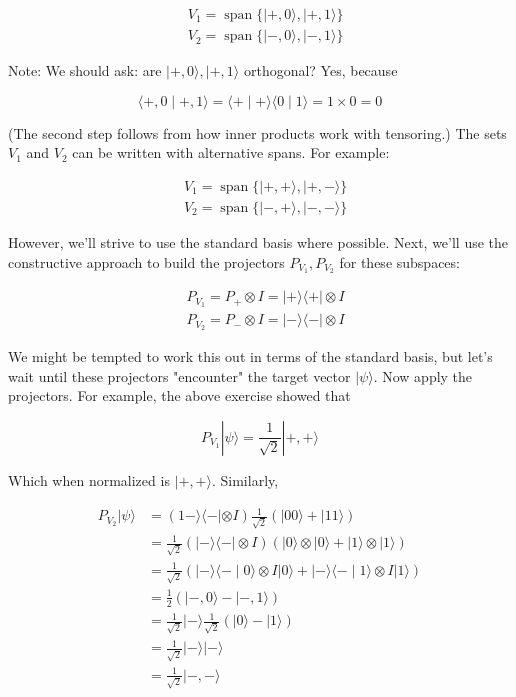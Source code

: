 \documentclass[main.tex]{subfiles}
\begin{document}
    $$
    \begin{aligned}
    &V_{1}=\operatorname{span}\{|+, 0\rangle,|+, 1\rangle\} \\
    &V_{2}=\operatorname{span}\{|-, 0\rangle,|-, 1\rangle\}
    \end{aligned}
    $$
    
    Note: We should ask: are $|+, 0\rangle,|+, 1\rangle$ orthogonal? Yes, because
    
    $$
    \langle+, 0 \mid+, 1\rangle=\langle+\mid+\rangle\langle 0 \mid 1\rangle=1 \times 0=0
    $$
    
    (The second step follows from how inner products work with tensoring.) The sets $V_{1}$ and $V_{2}$ can be written with alternative spans. For example:
    
    $$
    \begin{aligned}
    &V_{1}=\operatorname{span}\{|+,+\rangle,|+,-\rangle\} \\
    &V_{2}=\operatorname{span}\{|-,+\rangle,|-,-\rangle\}
    \end{aligned}
    $$
    
    However, we'll strive to use the standard basis where possible. Next, we'll use the constructive approach to build the projectors $P_{V_{1}}, P_{V_{2}}$ for these subspaces:
    
    $$
    \begin{aligned}
    &P_{V_{1}}=P_{+} \otimes I=|+\rangle\langle+| \otimes I \\
    &P_{V_{2}}=P_{-} \otimes I=|-\rangle\langle-| \otimes I
    \end{aligned}
    $$
    
    We might be tempted to work this out in terms of the standard basis, but let's wait until these projectors "encounter" the target vector $|\psi\rangle$. Now apply the projectors. For example, the above exercise showed that
    
    $$
    P_{V_{1}}|\psi\rangle=\frac{1}{\sqrt{2}}|+,+\rangle
    $$
    
    Which when normalized is $|+,+\rangle$. Similarly,
    
    $$
    \begin{aligned}
    P_{V_{2}}|\psi\rangle &=(1-\rangle\langle-| \otimes I) \frac{1}{\sqrt{2}}(|00\rangle+|11\rangle) \\
    &=\frac{1}{\sqrt{2}}(|-\rangle\langle-| \otimes I)(|0\rangle \otimes|0\rangle+|1\rangle \otimes|1\rangle) \\
    &=\frac{1}{\sqrt{2}}(|-\rangle\langle-\mid 0\rangle \otimes I|0\rangle+|-\rangle\langle-\mid 1\rangle \otimes I|1\rangle) \\
    &=\frac{1}{2}(|-, 0\rangle-|-, 1\rangle) \\
    &=\frac{1}{\sqrt{2}}|-\rangle \frac{1}{\sqrt{2}}(|0\rangle-|1\rangle) \\
    &=\frac{1}{\sqrt{2}}|-\rangle|-\rangle \\
    &=\frac{1}{\sqrt{2}}|-,-\rangle
    \end{aligned}
    $$
    
\end{document}
